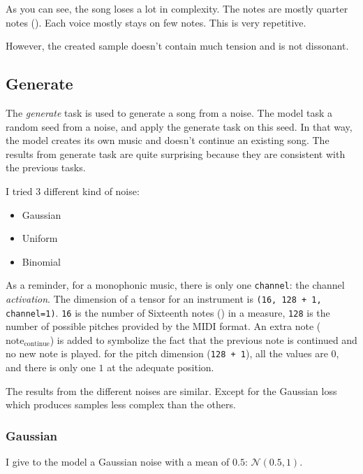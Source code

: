 \documentclass[12pt]{report}
\begin{document}
As you can see, the song loses a lot in complexity.
The notes are mostly quarter notes (\musQuarter).
Each voice mostly stays on few notes.
This is very repetitive.

However, the created sample doesn't contain much tension and is not dissonant.

\subsection{Generate}
\label{sec:tasks:generate-noise}


The \textit{generate} task is used to generate a song from a noise.
The model task a random seed from a noise, and apply the generate task on this seed.
In that way, the model creates its own music and doesn't continue an existing song.
The results from generate task are quite surprising because they are consistent with the previous tasks.

I tried 3 different kind of noise:
\begin{itemize}
    \item Gaussian
    \item Uniform
    \item Binomial
\end{itemize}

As a reminder, for a monophonic music, there is only one \texttt{channel}: the channel \textit{activation}.
The dimension of a tensor for an instrument is \texttt{(16, 128 + 1, channel=1)}.
\texttt{16} is the number of Sixteenth notes (\musSixteenth) in a measure, \texttt{128} is the number of possible pitches provided by the MIDI format.
An extra note ($\text{note}_{\text{continue}}$) is added to symbolize the fact that the previous note is continued and no new note is played.
for the pitch dimension (\texttt{128 + 1}), all the values are $0$, and there is only one $1$ at the adequate position.

The results from the different noises are similar.
Except for the Gaussian loss which produces samples less complex than the others.

\subsubsection{Gaussian}
\label{sec:task:generate-noise:gaussian}

I give to the model a Gaussian noise with a mean of $0.5$: $\mathcal{N}(0.5, 1)$.
\end{document}
